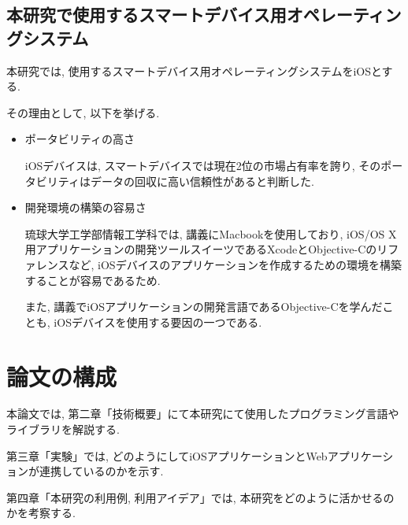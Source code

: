 \subsection{本研究で使用するスマートデバイス用オペレーティングシステム}
本研究では, 使用するスマートデバイス用オペレーティングシステムをiOSとする.

その理由として, 以下を挙げる.

\begin{itemize}
\item ポータビリティの高さ

iOSデバイスは, スマートデバイスでは現在2位の市場占有率を誇り, そのポータビリティはデータの回収に高い信頼性があると判断した.

\item 開発環境の構築の容易さ

琉球大学工学部情報工学科では, 講義にMacbookを使用しており, iOS/OS X用アプリケーションの開発ツールスイーツであるXcodeとObjective-Cのリファレンスなど, iOSデバイスのアプリケーションを作成するための環境を構築することが容易であるため.

また, 講義でiOSアプリケーションの開発言語であるObjective-Cを学んだことも, iOSデバイスを使用する要因の一つである.
\end{itemize}

\section{論文の構成}
本論文では, 第二章「技術概要」にて本研究にて使用したプログラミング言語やライブラリを解説する.

第三章「実験」では, どのようにしてiOSアプリケーションとWebアプリケーションが連携しているのかを示す.

第四章「本研究の利用例, 利用アイデア」では, 本研究をどのように活かせるのかを考察する.
